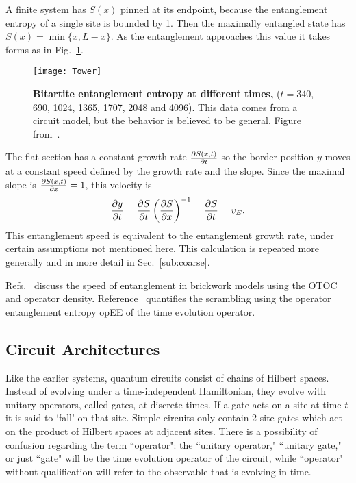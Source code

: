 A finite system has $S(x)$ pinned at its endpoint, because the entanglement entropy of a single site is bounded by 1. Then the maximally entangled state has $S(x) = \min\{x,L-x\}$. As the entanglement approaches this value it takes forms as in Fig.~\ref{fig:Tower}.
\begin{figure}
	\centering
	\texttt{[image: Tower]}
	\caption{\textbf{Bitartite entanglement entropy at different times,} ($t = 340$, 690, 1024, 1365, 1707, 2048 and 4096). This data comes from a circuit model, but the behavior is believed to be general. Figure from~\cite{Nahum2017}.}
	\label{fig:Tower}
\end{figure}
The flat section has a constant growth rate $\frac{\partial S(x,t)}{\partial t}$ so the border position $y$ moves at a constant speed defined by the growth rate and the slope. Since the maximal slope is $\frac{\partial S(x,t)}{\partial x}=1$, this velocity is
\begin{align}
\frac{\partial y}{\partial t} = \frac{\partial S}{\partial t}\left(\frac{\partial S}{\partial x}\right)^{-1} = \frac{\partial S}{\partial t} = v_E. 
\label{eqn:vE}
\end{align}
This entanglement speed is equivalent to the entanglement growth rate, under certain assumptions not mentioned here. This calculation is repeated more generally and in more detail in Sec.~\ref{sub:coarse}.

Refs.~\cite{Keyserlingk, Jonay17, Jonay18, Nahum2017} discuss the speed of entanglement in brickwork models using the OTOC and operator density. Reference~\cite{Zhou2017} quantifies the scrambling using the operator entanglement entropy opEE of the time evolution operator.

\subsection{Circuit Architectures} \label{sub:arch}

Like the earlier systems, quantum circuits consist of chains of Hilbert spaces. Instead of evolving under a time-independent Hamiltonian, they evolve with unitary operators, called gates, at discrete times. If a gate acts on a site at time $t$ it is said to `fall' on that site. Simple circuits only contain 2-site gates which act on the product of Hilbert spaces at adjacent sites. There is a possibility of confusion regarding the term ``operator": the ``unitary operator," ``unitary gate," or just ``gate" will be the time evolution operator of the circuit, while ``operator" without qualification will refer to the observable that is evolving in time.

